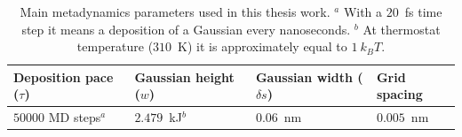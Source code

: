 \begin{table}[ht]
	\centering
	\begin{tabular}{llll}
		\toprule
		Deposition pace ($\tau$) & Gaussian height ($w$)& Gaussian width ($\delta s$) & Grid spacing \\ \toprule
		$50000$ \ac{MD} steps$^a$ & $2.479$~kJ$^b$ & $0.06$~nm & $0.005$~nm \\ \bottomrule
	\end{tabular}
	\caption{Main metadynamics parameters used in this thesis work. $^a$ With a $20$~fs time step it means a deposition of a Gaussian every nanoseconds. $^b$ At thermostat temperature ($310$~K) it is approximately equal to $1~k_BT$.}%
	\label{tab:metadynParam}
\end{table}
